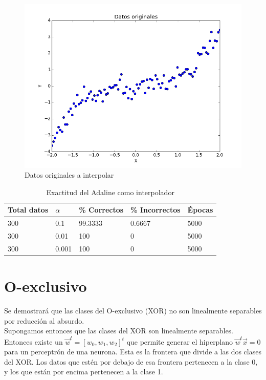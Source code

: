 \documentclass[a4paper]{article}
\begin{document}
	\begin{figure}[H]
	\centering
	\includegraphics[scale=0.3]{interpolado.png}
	\caption{Datos originales a interpolar}
	\label{fig:interpolador}
	\end{figure}
	
	\begin{table}[H]
	\begin{center}
	\begin{tabular}{|l|l|l|l|l|}
	\hline
	Total datos & $\alpha$ & \% Correctos & \% Incorrectos & Épocas\\
	\hline \hline
	300 & 0.1 & 99.3333 & 0.6667 & 5000\\ \hline
	300 & 0.01 & 100 & 0 & 5000\\ \hline
	300 & 0.001 & 100 & 0 & 5000\\ \hline
	\end{tabular}
	\caption{Exactitud del Adaline como interpolador}
	\label{tabla:accInter}
	\end{center}
	\end{table}

\section{O-exclusivo}
Se demostrará que las clases del O-exclusivo (XOR) no son linealmente separables por reducción al absurdo.\\

Supongamos entonces que las clases del XOR son linealmente separables. Entonces existe un $\vec{w}^{t} = [w_{0}, w_{1}, w_{2}]^{t}$ que permite generar el hiperplano $\vec{w}^{t}\vec{x} = 0$ para un perceptrón de una neurona. Esta es la frontera que divide a las dos clases del XOR. Los datos que estén por debajo de esa frontera pertenecen a la clase 0, y los que están por encima pertenecen a la clase 1.\\
\end{document}
